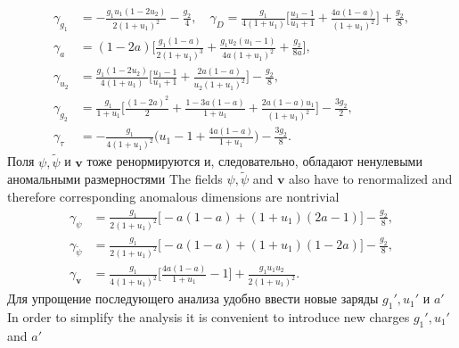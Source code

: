 \documentclass[12pt]{article}
\def\mv{{\bm v}}
\begin{document}
\begin{align}
 \gamma_{g_1} & = -\frac{g_1 u_1(1-2u_2)}{2(1+u_1)^2}
 - \frac{g_2}{4},\quad
 \gamma_D  =  \frac{g_1}{4(1+u_1)}\biggl[
      \frac{u_1-1}{u_1+1}+\frac{4 a(1-a)}{(1+u_1)^2}
      \biggl] + \frac{g_2}{8} , \nonumber\\
  \gamma_a & = (1-2a)\biggl[
      \frac{g_1(1-a)}{2(1+u_1)^3} + \frac{g_1 u_2(u_1-1)}{4a(1+u_1)^2} 
       + \frac{g_2}{8a}
  \biggl] , \nonumber\\
  \gamma_{u_2} & = 
    \frac{g_1(1-2u_2)}{4(1+u_1)}\biggl[
    \frac{u_1-1}{u_1+1} + \frac{2 a(1-a)}{u_2(1+u_1)^2}
    \biggl]
  -\frac{g_2}{8}, \nonumber\\
  \gamma_{g_2} & = 
   \frac{g_1}{1+u_1}\biggl[
   \frac{(1-2a)^2}{2} + \frac{1-3a(1-a)}{1+u_1}
   + \frac{2a(1-a)u_1}{(1+u_1)^2} 
   \biggl]
   -\frac{3g_2}{2}, \nonumber\\
   \gamma_{\tau} & = -\frac{g_1}{4(1+u_1)^2}
   \biggl(
   u_1-1 + \frac{4a(1-a)}{1+u_1}\biggl)
   - \frac{3g_2}{8}.
    \label{eq:gen_anom_charges} 
\end{align}
Поля $\psi,\tilde{\psi}$ и $\mv$ тоже ренормируются и, следовательно, обладают ненулевыми аномальными размерностями
The fields $\psi,\tilde{\psi}$ and $\mv$ also have to renormalized and therefore
corresponding anomalous dimensions are nontrivial
\begin{align}
  \gamma_{\psi} & = \frac{g_1 }{2(1+u_1)^2}\biggl[
  -a(1-a) + (1+u_1)(2a-1)
  \biggl] - \frac{g_2}{8}, \nonumber\\ 
  \gamma_{\tilde{\psi}} & =
  \frac{g_1}{2(1+u_1)^2}\biggl[
  -a(1-a) + (1+u_1)(1-2a)
  \biggl] - \frac{g_2}{8}, \nonumber\\ 
  \gamma_{\mv} & =  \frac{g_1}{4(1+u_1)^2}\biggl[
     \frac{4a(1-a)}{1+u_1}-1 \biggl] + \frac{g_1 u_1 u_2}{2(1+u_1)^2}.
 \label{eq:gen_anom_fields}
\end{align}
Для упрощение последующего анализа удобно ввести новые заряды $g_1',u_1'$ и $a'$
In order to simplify the analysis it is convenient to introduce new charges $g_1',u_1'$ and $a'$
\end{document}
